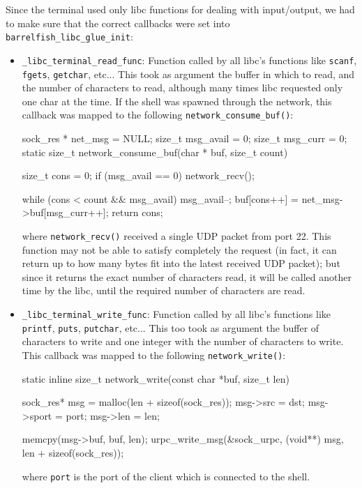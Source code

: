 \documentclass[a4paper,twoside,openright]{report}
\renewcommand{\t}[1]{%
	{\texttt{#1}}}
\begin{document}
Since the terminal used only libc functions for dealing with input/output, we had to make
sure that the correct callbacks were set into \t{barrelfish\_libc\_glue\_init}:
\begin{itemize}
	\item \t{\_libc\_terminal\_read\_func}: Function called by all libc's functions like
		\t{scanf}, \t{fgets}, \t{getchar}, etc... 
		This took as argument the buffer in which to read, and 
		the number of characters to read, although many times
		libc requested only one char at the time. If the shell
		was spawned through the network, this callback was mapped to the
		following \t{network\_consume\_buf()}:
		\begin{pandacode}
sock_res * net_msg = NULL;
size_t msg_avail = 0;
size_t msg_curr  = 0;
static size_t network_consume_buf(char * buf, size_t count) {
	size_t cons = 0;
	if (msg_avail == 0)
		network_recv();

	while (cons < count && msg_avail) {
		msg_avail--;
		buf[cons++] = net_msg->buf[msg_curr++];
	}
	return cons;
}
		\end{pandacode}
		where \t{network\_recv()} received a single UDP packet from port 22.
		This function may not be able to satisfy completely the request (in fact, it can
		return up to how many bytes fit into the latest received UDP packet); but since
		it returns the exact number of characters read, it will be called another time
		by the libc, until the required number of characters are read.
	\item \t{\_libc\_terminal\_write\_func}: Function called by all libc's functions like
		\t{printf}, \t{puts}, \t{putchar}, etc... 
		This too took as argument the buffer of characters to write and
		one integer with the number of characters to write. 
		This callback was mapped to the following \t{network\_write()}:
		\begin{pandacode}
static inline size_t network_write(const char *buf, size_t len) {
	sock_res* msg = malloc(len + sizeof(sock_res));
	msg->src = dst; 
	msg->sport = port;
	msg->len = len;

	memcpy(msg->buf, buf, len);
	urpc_write_msg(&sock_urpc, (void**) msg, len + sizeof(sock_res));
}
		\end{pandacode}
		where \t{port} is the port of the client which is connected to the shell.
\end{itemize}
\end{document}
